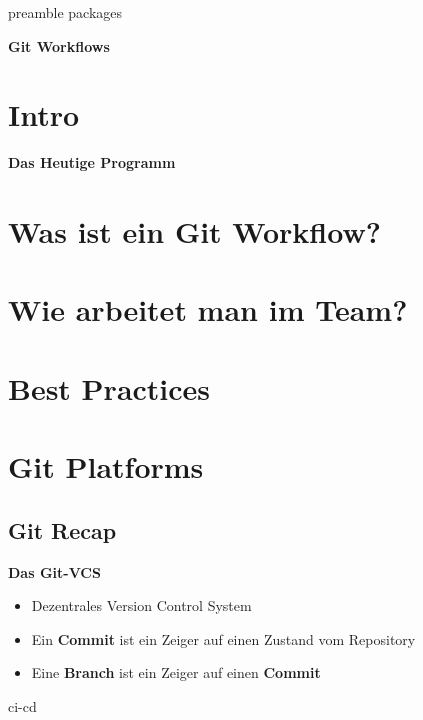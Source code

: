 \RequirePackage{import}
{preamble}
{packages}

    \begin{frame}[c]
        \centering
        \Large
        \textbf{Git Workflows}
    \end{frame}

    \section{Intro}\label{sec:intro}
    \begin{frame}[c]
        \slidehead
        \vspace{-1em}
        \large
        \textbf{Das Heutige Programm}
        \vspace{1em}
        \tableofcontents[subsubsectionstyle=hide]
    \end{frame}

    \section{Was ist ein Git Workflow?}\label{sec:git-workflow}
    \section{Wie arbeitet man im Team?}\label{sec:team}
    \section{Best Practices}\label{sec:best-practices}
    \section{Git Platforms}\label{sec:git-platforms}

    \subsection{Git Recap}\label{subsec:git-recap}
    \begin{frame}[c]
        \slidehead
        \vspace{-1em}
        \centering
        \large
        \textbf{Das Git-VCS}
        \vspace{2em}
        \begin{itemize}[<+->]
            \item Dezentrales Version Control System
            \item Ein \textbf{Commit} ist ein Zeiger auf einen Zustand vom Repository
            \item Eine \textbf{Branch} ist ein Zeiger auf einen \textbf{Commit}
        \end{itemize}
    \end{frame}

    {ci-cd}


